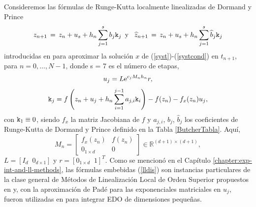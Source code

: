 Consideremos las fórmulas de Runge-Kutta localmente linealizadas de Dormand y Prince
\begin{equation} \label{lldis}
    z_{n+1}\,=\,z_n+u_s+h_n \sum_{j=1}^{s}b_j \mathtt{k}_j \,\,\, \text{y} \,\,\, \
    \widehat{z}_{n+1}\,=\, z_n+u_s+h_n \sum_{j=1}^{s}\widehat{b}_j \mathtt{k}_j
\end{equation}
introducidas en \cite{Jimenez14AMC} para aproximar la solución $x$ de (\ref{syst})-(\ref{systcond}) en $t_{n+1}$, para $n=0,\ldots,N -1$, donde s = 7 es el número de etapas,
\begin{equation*}
u_j=L\mathrm{e}^{c_j M_n h_n}r,
\end{equation*}
\begin{equation*}
\mathtt{k}_j = f\left( z_n+u_j+h_n \sum_{i=1}^{j-1}a_{j,i}\mathtt{k}_i \right) - f( z_n) - f_x(z_n)u_j,
\end{equation*}
con $\mathtt{k}_1 \equiv 0$, siendo $f_x$ la matriz Jacobiana de $f$ y $a_{j,i}$, $b_j$, $\widehat{b}_j$ los coeficientes de Runge-Kutta de Dormand y Prince definido en la Tabla \ref{ButcherTabla}. Aquí,
\begin{equation*}
    M_{n}=\left[
    \begin{array}{cc}
        f_{x}(z_{n}) & f(z_{n}) \\
        0_{1\times d} & 0
    \end{array}
    \right] \in \mathbb{R}^{(d+1)\times (d+1)},
\end{equation*}
$ L=[I_d \;\; 0_{d\times 1}] $ y $r=[0_{1\times d}\;\; 1]^T$. Como se mencionó en el Capítulo \ref{chapter:exp-int-and-ll-methods}, las fórmulas embebidas (\ref{lldis}) son instancias particulares de la clase general de Métodos de Linealización Local de Orden Superior propuestos en \cite{Jimenez13} y, con la aproximación de Padé para las exponenciales matriciales en $u_j$, fueron utilizadas en \cite{Jimenez14AMC} para integrar EDO de dimensiones pequeñas.

